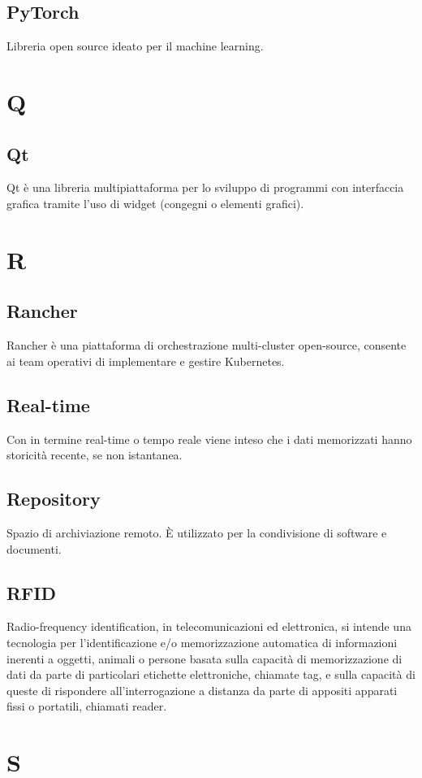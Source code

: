 \subsection{PyTorch} Libreria open source ideato per il machine learning.
\newpage \section{Q}
\subsection{Qt} Qt è una libreria multipiattaforma per lo sviluppo di programmi con interfaccia grafica tramite l'uso di widget (congegni o elementi grafici).
\newpage \section{R}
\subsection{Rancher} Rancher è una piattaforma di orchestrazione multi-cluster open-source, consente ai team operativi di implementare e gestire Kubernetes.
\subsection{Real-time} Con in termine real-time o tempo reale viene inteso che i dati memorizzati hanno storicità recente, se non istantanea.
\subsection{Repository} Spazio di archiviazione remoto. È utilizzato per la condivisione di software e documenti.
\subsection{RFID} Radio-frequency identification, in telecomunicazioni ed elettronica, si intende una tecnologia per l'identificazione e/o memorizzazione automatica di informazioni inerenti a oggetti, animali o persone basata sulla capacità di memorizzazione di dati da parte di particolari etichette elettroniche, chiamate tag, e sulla capacità di queste di rispondere all'interrogazione a distanza da parte di appositi apparati fissi o portatili, chiamati reader.
\newpage \section{S}
